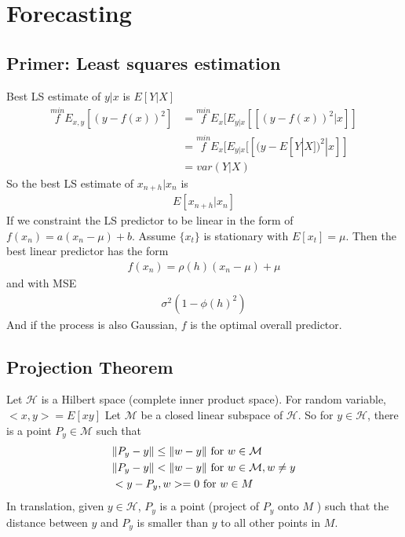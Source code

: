 \chapter{Forecasting}
\section{Primer: Least squares estimation}
Best LS estimate of $y|x$ is $E[Y|X]$
    \begin{align*}
        \overset{min}{f} E_{x,y}[(y - f(x))^2 ]
        & = \overset{min}{f} E_x[ E_{y|x}[[(y - f(x))^2|x]] \\
        & = \overset{min}{f} E_x[ E_{y|x}[[(y - E[Y|X])^2|x]] \\
        & = var(Y|X)
    \end{align*}
So the best LS estimate of $x_{n+h}|x_n$ is 
    \begin{align*}
        E[x_{n+h}|x_n]
    \end{align*}
If we constraint the LS predictor to be linear in the form of $f(x_n)=a(x_n-\mu) + b$. Assume $\{x_t \}$ is stationary with $E[x_t]=\mu$. Then the best linear predictor has the form 
    \begin{align*}
        f(x_n) = \rho(h)(x_n - \mu) + \mu
    \end{align*}
and with MSE 
    \begin{align*}
        \sigma^2(1-\phi(h)^2)
    \end{align*}
And if the process is also Gaussian, $f$ is the optimal overall predictor. 

\section{Projection Theorem} 
Let $\mathcal{H}$ is a Hilbert space (complete inner product space). For random variable, $<x,y> = E[xy]$ Let $\mathcal{M}$ be a closed linear subspace of $\mathcal{H}$. So for $y\in \mathcal{H}$, there is a point $P_y \in \mathcal{M}$ such that
    \begin{align*}
        & \Vert P_y - y \Vert \leq \Vert w - y \Vert \textrm{ for } w\in \mathcal{M}\\
        & \Vert P_y - y \Vert <\Vert w - y \Vert \textrm{ for } w\in \mathcal{M}, w\neq y\\  
        & <y-P_y, w> = 0 \textrm{ for } w\in M
    \end{align*}
In translation, given $y \in \mathcal{H}$, $P_y$ is a point (project of $P_y$ onto $M$ ) such that the distance between $y$ and $P_y$ is smaller than $y$ to all other points in $M$. 



